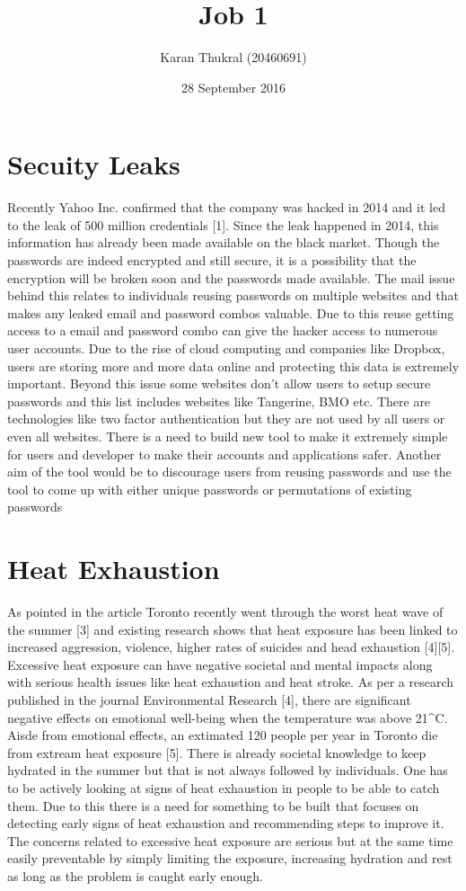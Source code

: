 \documentclass{article}
\title{Job 1}
\author{Karan Thukral (20460691)}
\date{28 September 2016}
\begin{document}
\maketitle

\section{Secuity Leaks}
Recently Yahoo Inc. confirmed that the company was hacked in 2014 and it led to the leak of 500 million credentials [1]. Since the leak happened in 2014, this information has already been made available on the black market. Though the passwords are indeed encrypted and still secure, it is a possibility that the encryption will be broken soon and the passwords made available. The mail issue behind this relates to individuals reusing passwords on multiple websites and that makes any leaked email and password combos valuable. Due to this reuse getting access to a email and password combo can give the hacker access to numerous user accounts. Due to the rise of cloud computing and companies like Dropbox, users are storing more and more data online and protecting this data is extremely important. Beyond this issue some websites don't allow users to setup secure passwords and this list includes websites like Tangerine, BMO etc. There are technologies like two factor authentication but they are not used by all users or even all websites. There is a need to build new tool to make it extremely simple for users and developer to make their accounts and applications safer. Another aim of the tool would be to discourage users from reusing passwords and use the tool to come up with either unique passwords or permutations of existing passwords

\section{Heat Exhaustion}
As pointed in the article Toronto recently went through the worst heat wave of the summer [3] and existing research shows that heat exposure has been linked to increased aggression, violence, higher rates of suicides and head exhaustion [4][5]. Excessive heat exposure can have negative societal and mental impacts along with serious health issues like heat exhaustion and heat stroke. As per a research published in the journal Environmental Research [4], there are significant negative effects on emotional well-being when the temperature was above 21^\circ C. Aisde from emotional effects, an extimated 120 people per year in Toronto die from extream heat exposure [5]. There is already societal knowledge to keep hydrated in the summer but that is not always followed by individuals. One has to be actively looking at signs of heat exhaustion in people to be able to catch them. Due to this there is a need for something to be built that focuses on detecting early signs of heat exhaustion and recommending steps to improve it. The concerns related to excessive heat exposure are serious but at the same time easily preventable by simply limiting the exposure, increasing hydration and rest as long as the problem is caught early enough. 
\end{document}
